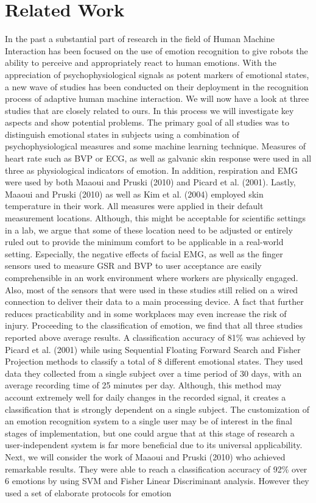 
\section{Related Work}\label{relwo}
In the past a substantial part of research in the field of Human Machine Interaction has been focused on the use of emotion recognition to give robots the ability to perceive and appropriately react to human emotions. With the appreciation of psychophysiological signals as potent markers of emotional states, a new wave of studies has been conducted on their deployment in the recognition process of adaptive human machine interaction.
We will now have a look at three studies that are closely related to ours. In this process we will investigate key aspects and show potential problems. The primary goal of all studies was to distinguish emotional states in subjects using a combination of psychophysiological measures and some machine learning technique. Measures of heart rate such as BVP or ECG, as well as galvanic skin response were used in all three as physiological indicators of emotion. In addition, respiration and EMG were used by both Maaoui and Pruski (2010) and Picard et al. (2001). Lastly, Maaoui and Pruski (2010) as well as Kim et al. (2004) employed skin temperature in their work. All measures were applied in their default measurement locations. Although, this might be acceptable for scientific settings in a lab, we argue that some of these location need to be adjusted or entirely ruled out to provide the minimum comfort to be applicable in a real-world setting. Especially, the negative effects of facial EMG, as well as the finger sensors used to measure GSR and BVP to user acceptance are easily comprehensible in an work environment where workers are physically engaged. Also, most of the sensors that were used in these studies still relied on a wired connection to deliver their data to a main processing device. A fact that further reduces practicability and in some workplaces may even increase the risk of injury.
Proceeding to the classification of emotion, we find that all three studies reported above average results. A classification accuracy of 81\% was achieved by Picard et al. (2001) while using Sequential Floating Forward Search and Fisher Projection methods to classify a total of 8 different emotional states. They used data they collected from a single subject over a time period of 30 days, with an average recording time of 25 minutes per day. Although, this method may account extremely well for daily changes in the recorded signal, it creates a  classification that is strongly dependent on a single subject. The customization of an emotion recognition system to a single user may be of interest in the final stages of implementation, but one could argue that at this stage of research a user-independent system is far more beneficial due to its universal applicability. Next, we will consider the work of Maaoui and Pruski (2010) who achieved remarkable results. They were able to reach a classification accuracy of 92\% over 6 emotions by using SVM and Fisher Linear Discriminant analysis. However they used a set of elaborate protocols for emotion

